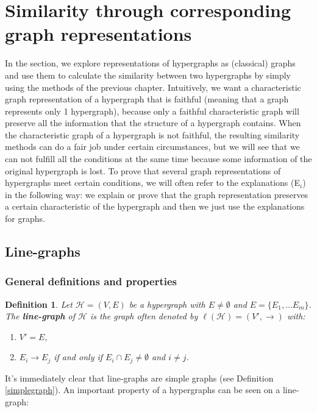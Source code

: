 \documentclass[a4paper,11pt]{report}
\newtheorem{definition}[theorem]{Definition}
\newcommand{\hgrafeen}{\mathcal{H}}
\begin{document}
\section{Similarity through corresponding graph representations}
In the section, we explore representations of hypergraphs as (classical) graphs and use 
them to calculate the similarity between two hypergraphs by simply using the 
methods of the previous chapter. Intuitively, we want a characteristic graph
representation of a hypergraph that is faithful (meaning that a graph represents
only 1 hypergraph), because only a faithful
characteristic graph will preserve all the information that the structure of a hypergraph
contains. When the characteristic graph of a hypergraph is not faithful,
the resulting similarity methods 
can do a fair job under certain circumstances, but we will see that we can not fulfill
all the conditions at the same time because some information of the original hypergraph is lost. 
To prove that several graph representations of hypergraphs meet certain 
conditions, we will often refer to the explanations (E$_i$) in the following 
way: we explain or prove that the graph representation preserves a certain 
characteristic of the hypergraph and then we just use the explanations for 
graphs. 

\subsection{Line-graphs}
\subsubsection{General definitions and properties}
\begin{definition}\label{linegraphdef}
  Let $\hgrafeen = (V,E)$ be a hypergraph with $E \not = \emptyset$ and $E = \{E_1, \ldots E_m\}$. The \textbf{line-graph} of $\hgrafeen$ is the graph 
  often denoted by $\ell(\hgrafeen) = (V', \to)$ 
with:
  \begin{enumerate}
    \item $V' = E$,
    \item $E_i \to E_j$ if and only if $E_i \cap E_j \not = \emptyset$ and $i \not = j$.
      \end{enumerate}
\end{definition}

It's immediately clear that line-graphs are simple graphs (see Definition \ref{simplegraph}). 
An important property of a hypergraphs can be seen on a line-graph:
\end{document}
